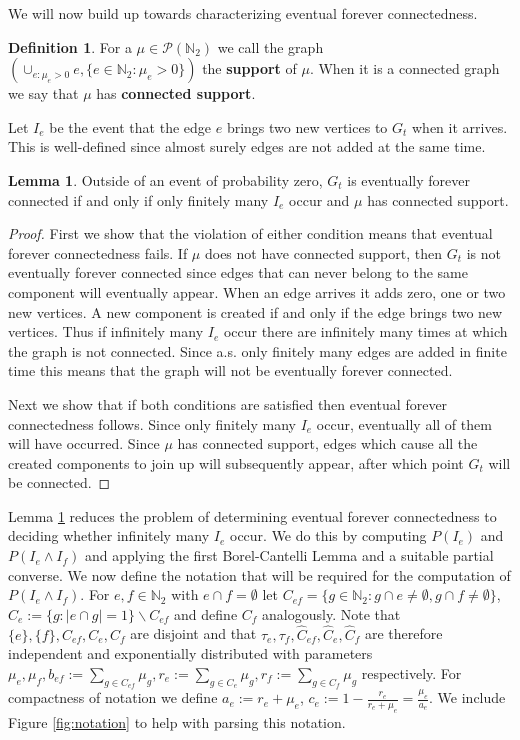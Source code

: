 \documentclass[12pt]{article}
\theoremstyle{definition}
\newtheorem{lemma}[proposition]{Lemma}
\newtheorem{definition}[proposition]{Definition}
\begin{document}
We will now build up towards characterizing eventual forever connectedness. 

\begin{definition}
    For a $\mu \in \mathcal{P}(\mathbb{N}_2)$ we call the graph $(\cup_{e: \mu_e>0}e,\{e \in \mathbb{N}_2: \mu_e>0\})$ the \textbf{support} of $\mu$. When it is a connected graph we say that $\mu$ has \textbf{connected support}.
\end{definition}
Let $I_{e}$ be the event that the edge $e$ brings two new vertices to $G_t$ when it arrives. This is well-defined since almost surely edges are not added at the same time. 

\begin{lemma} \label{fin components imply eventually connected} Outside of an event of probability zero, $G_t$ is eventually forever connected if and only if only finitely many $I_e$ occur and $\mu$ has connected support.
\end{lemma}
\begin{proof}
First we show that the violation of either condition means that eventual forever connectedness fails. If $\mu$ does not have connected support, then $G_t$ is not eventually forever connected since edges that can never belong to the same component will eventually appear. When an edge arrives it adds zero, one or two new vertices. A new component is created if and only if the edge brings two new vertices. Thus if infinitely many $I_e$ occur there are infinitely many times at which the graph is not connected. Since a.s. only finitely many edges are added in finite time this means that the graph will not be eventually forever connected.

Next we show that if both conditions are satisfied then eventual forever connectedness follows. Since only finitely many $I_e$ occur, eventually all of them will have occurred. Since $\mu$ has connected support, edges which cause all the created components to join up will subsequently appear, after which point $G_t$ will be connected.
\end{proof} 

Lemma \ref{fin components imply eventually connected} reduces the problem of determining eventual forever connectedness to deciding whether infinitely many $I_e$ occur. We do this by computing $P(I_e)$ and $P(I_e \wedge I_f)$ and applying the first Borel-Cantelli Lemma and a suitable partial converse. We now define the notation that will be required for the computation of $P(I_e \wedge I_f)$. For $e,f \in \mathbb{N}_2$ with $e \cap f = \emptyset$ let $C_{ef} = \{g \in \mathbb{N}_2: g \cap e \neq \emptyset, g \cap f \neq \emptyset\}$, $C_e := \{g: |e \cap g|=1\}\backslash C_{ef}$ and define $C_f$ analogously. Note that $\{e\},\{f\},C_{ef},C_e,C_f$ are disjoint and that $\tau_e,\tau_f,\hat{C}_{ef},\hat{C}_e,\hat{C}_f$ are therefore independent and exponentially distributed with parameters $\mu_e,\mu_f,b_{ef} := \sum_{g \in C_{ef}}\mu_g,r_e := \sum_{g \in C_{e}}\mu_g,r_f := \sum_{g \in C_{f}}\mu_g$ respectively. For compactness of notation we define $a_e := r_e+\mu_e$, $c_e := 1-\frac{r_e}{r_e+\mu_e}=\frac{\mu_e}{a_e}$. We include Figure \ref{fig:notation} to help with parsing this notation.
\end{document}
